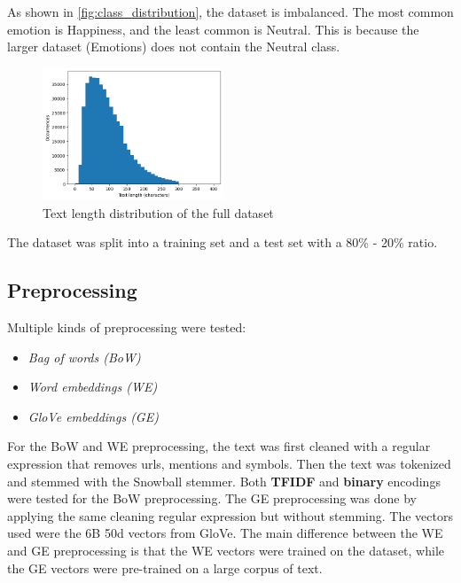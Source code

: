 As shown in \autoref{fig:class_distribution},
the dataset is imbalanced. The most common
emotion is Happiness, and the least common
is Neutral. This is because the larger dataset
(Emotions) does not contain the Neutral class.

\begin{figure}[H]
    \centering
    \includegraphics[width=0.48\textwidth]{assets/length_distribution.png}
    \caption{Text length distribution of the full dataset}
    \label{fig:length_distribution}
\end{figure}

The dataset was split into a training set
and a test set with a 80\% - 20\% ratio.

\subsection{Preprocessing}
Multiple kinds of preprocessing were tested:
\begin{itemize}
    \item \textit{Bag of words (BoW)}
    \item \textit{Word embeddings (WE)}
    \item \textit{GloVe embeddings (GE)}
\end{itemize}
For the BoW and WE preprocessing, the text was
first cleaned with a regular expression that
removes urls, mentions and symbols. Then the
text was tokenized and stemmed with the 
Snowball stemmer. Both \textbf{TFIDF} and 
\textbf{binary} encodings were tested for
the BoW preprocessing.
The GE preprocessing was done by applying 
the same cleaning regular
expression but without stemming. The vectors
used were the 6B 50d vectors from
GloVe\cite{glove}.
The main difference between the WE and GE
preprocessing is that the WE vectors were
trained on the dataset, while the GE vectors
were pre-trained on a large corpus of text.
